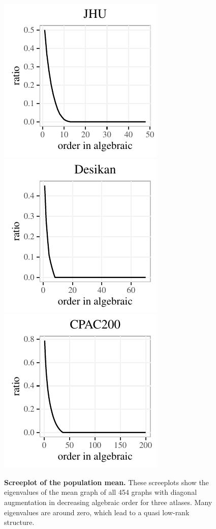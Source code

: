\documentclass[10pt,letterpaper]{article}
\begin{document}
\begin{figure}[!htbp]
\centering
\includegraphics[height=.2\textheight]{screeplot_ratio_JHU_lowrank.pdf} 
\includegraphics[height=.2\textheight]{screeplot_ratio_desikan_lowrank.pdf} 
\includegraphics[height=.2\textheight]{screeplot_ratio_CPAC200_lowrank.pdf} 
\caption{{\bf Screeplot of the population mean.}
These screeplots show the eigenvalues of the mean graph of all 454 graphs with diagonal augmentation in decreasing algebraic order for three atlases. Many eigenvalues are around zero, which lead to a quasi low-rank structure.
}
\label{fig:screeplot_lowrank}
\end{figure}
\end{document}
